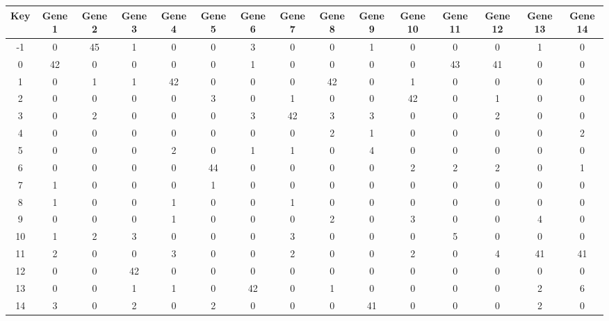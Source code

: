 \begin{tabular}{|c|c|c|c|c|c|c|c|c|c|c|c|c|c|c|}
\hline
Key & Gene 1 & Gene 2 & Gene 3 & Gene 4 & Gene 5 & Gene 6 & Gene 7 & Gene 8 & Gene 9 & Gene 10 & Gene 11 & Gene 12 & Gene 13 & Gene 14 \\
\hline
-1 & 0 & 45 & 1 & 0 & 0 & 3 & 0 & 0 & 1 & 0 & 0 & 0 & 1 & 0 \\
0 & 42 & 0 & 0 & 0 & 0 & 1 & 0 & 0 & 0 & 0 & 43 & 41 & 0 & 0 \\
1 & 0 & 1 & 1 & 42 & 0 & 0 & 0 & 42 & 0 & 1 & 0 & 0 & 0 & 0 \\
2 & 0 & 0 & 0 & 0 & 3 & 0 & 1 & 0 & 0 & 42 & 0 & 1 & 0 & 0 \\
3 & 0 & 2 & 0 & 0 & 0 & 3 & 42 & 3 & 3 & 0 & 0 & 2 & 0 & 0 \\
4 & 0 & 0 & 0 & 0 & 0 & 0 & 0 & 2 & 1 & 0 & 0 & 0 & 0 & 2 \\
5 & 0 & 0 & 0 & 2 & 0 & 1 & 1 & 0 & 4 & 0 & 0 & 0 & 0 & 0 \\
6 & 0 & 0 & 0 & 0 & 44 & 0 & 0 & 0 & 0 & 2 & 2 & 2 & 0 & 1 \\
7 & 1 & 0 & 0 & 0 & 1 & 0 & 0 & 0 & 0 & 0 & 0 & 0 & 0 & 0 \\
8 & 1 & 0 & 0 & 1 & 0 & 0 & 1 & 0 & 0 & 0 & 0 & 0 & 0 & 0 \\
9 & 0 & 0 & 0 & 1 & 0 & 0 & 0 & 2 & 0 & 3 & 0 & 0 & 4 & 0 \\
10 & 1 & 2 & 3 & 0 & 0 & 0 & 3 & 0 & 0 & 0 & 5 & 0 & 0 & 0 \\
11 & 2 & 0 & 0 & 3 & 0 & 0 & 2 & 0 & 0 & 2 & 0 & 4 & 41 & 41 \\
12 & 0 & 0 & 42 & 0 & 0 & 0 & 0 & 0 & 0 & 0 & 0 & 0 & 0 & 0 \\
13 & 0 & 0 & 1 & 1 & 0 & 42 & 0 & 1 & 0 & 0 & 0 & 0 & 2 & 6 \\
14 & 3 & 0 & 2 & 0 & 2 & 0 & 0 & 0 & 41 & 0 & 0 & 0 & 2 & 0 \\
\hline
\end{tabular}
